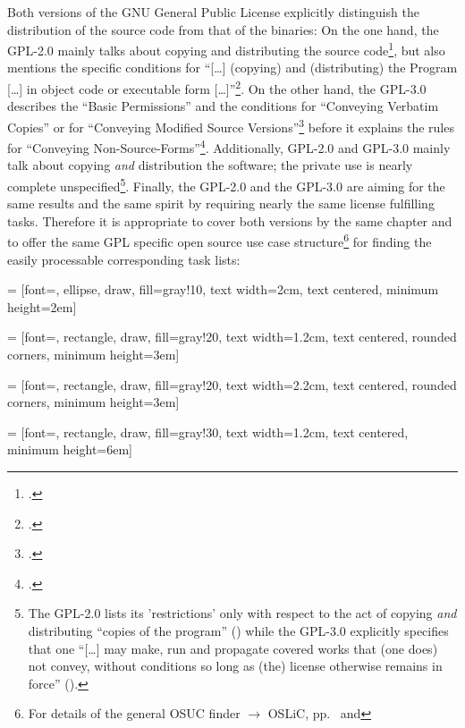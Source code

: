 Both versions of the GNU General Public License explicitly distinguish the
distribution of the source code from that of the binaries: On the one hand, the
GPL-2.0 mainly talks about copying and distributing the source
code\footcite[cf.][\nopage wp.\ §1, §2]{Gpl20OsiLicense1991a}, but also mentions
the specific conditions for \enquote{[\ldots] (copying) and (distributing) the
Program [\ldots] in object code or executable form
[\ldots]}\footcite[cf.][\nopage wp.\ §3]{Gpl20OsiLicense1991a}. On the other
hand, the GPL-3.0 describes the \enquote{Basic Permissions} and the conditions
for \enquote{Conveying Verbatim Copies} or for \enquote{Conveying Modified
Source Versions}\footcite[cf.][\nopage wp.\ §2, §4, §5]{Gpl30OsiLicense2007a}
before it explains the rules for \enquote{Conveying
Non-Source-Forms}\footcite[cf.][\nopage wp.\ §2, §4, §5]{Gpl30OsiLicense2007a}.
Additionally, GPL-2.0 and GPL-3.0 mainly talk about copying \emph{and}
distribution the software; the private use is nearly complete
unspecified\footnote{The GPL-2.0 lists its 'restrictions' only with respect to
the act of copying \emph{and} distributing \enquote{copies of the program}
(\cite[cf.][\nopage wp.\ §1, §2, §4 et passim; emphasizings by
KR]{Gpl20OsiLicense1991a}) while the GPL-3.0 explicitly specifies that one
\enquote{[\ldots] may make, run and propagate covered works that (one does) not
convey, without conditions so long as (the) license otherwise remains in force}
(\cite[cf.][\nopage wp.\ §2]{Gpl30OsiLicense2007a}).}. Finally, the GPL-2.0 and
the GPL-3.0 are aiming for the same results and the same spirit by requiring
nearly the same license fulfilling tasks. Therefore it is appropriate to cover
both versions by the same chapter and to offer the same GPL specific open source
use case structure\footnote{For details of the general OSUC finder $\rightarrow$
OSLiC, pp.\ \pageref{OsucTokens} and \pageref{OsucDefinitionTree}} for finding
the easily processable corresponding task lists:
 
 = [font=\small, ellipse, draw, fill=gray!10, 
    text width=2cm, text centered, minimum height=2em]


 = [font=\footnotesize, rectangle, draw, fill=gray!20, 
    text width=1.2cm, text centered, rounded corners, minimum height=3em]

 = [font=\footnotesize, rectangle, draw, fill=gray!20, 
    text width=2.2cm, text centered, rounded corners, minimum height=3em]
    
 = [font=\tiny, rectangle, draw, fill=gray!30, 
    text width=1.2cm, text centered, minimum height=6em]

